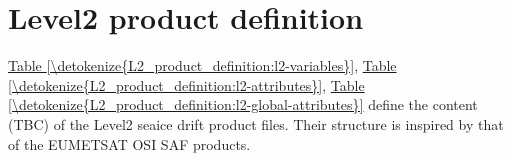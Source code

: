 \documentclass[letterpaper,10pt,english]{jupyterBook}
\begin{document}
\chapter{Level\sphinxhyphen{}2 product definition}
\label{\detokenize{L2_product_definition:level-2-product-definition}}\label{\detokenize{L2_product_definition::doc}}
\sphinxAtStartPar
\hyperref[\detokenize{L2_product_definition:l2-variables}]{Table \ref{\detokenize{L2_product_definition:l2-variables}}}, \hyperref[\detokenize{L2_product_definition:l2-attributes}]{Table \ref{\detokenize{L2_product_definition:l2-attributes}}}, \hyperref[\detokenize{L2_product_definition:l2-global-attributes}]{Table \ref{\detokenize{L2_product_definition:l2-global-attributes}}} define the content (TBC) of the Level\sphinxhyphen{}2 sea\sphinxhyphen{}ice drift product files. Their structure
is inspired by that of the EUMETSAT OSI SAF products.
\end{document}
